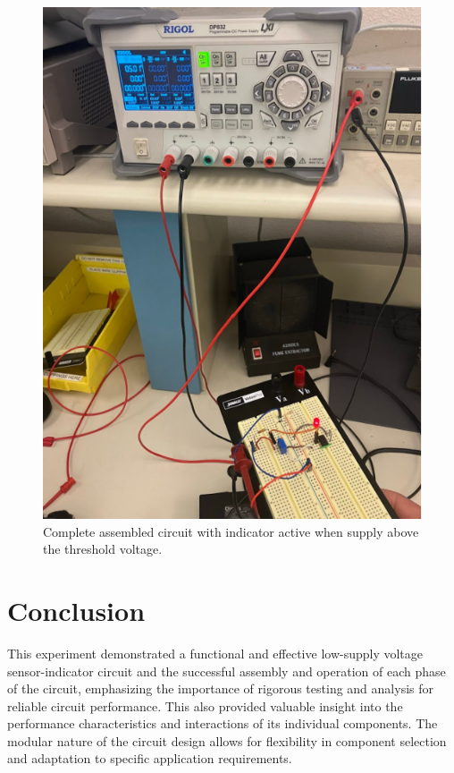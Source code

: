 \documentclass[conference]{IEEEtran}
\begin{document}
\begin{figure}[htbp]
\centerline{\includegraphics{./images/circuitbuilt2.png}}
\caption{Complete assembled circuit with indicator active when supply above the threshold voltage.}
\label{circuitbuilt2}
\end{figure}

\section{Conclusion}

This experiment demonstrated a functional and effective low-supply voltage sensor-indicator circuit and the successful assembly and operation of each phase of the circuit, emphasizing the importance of rigorous testing and analysis for reliable circuit performance. This also provided valuable insight into the performance characteristics and interactions of its individual components. The modular nature of the circuit design allows for flexibility in component selection and adaptation to specific application requirements.
\end{document}
